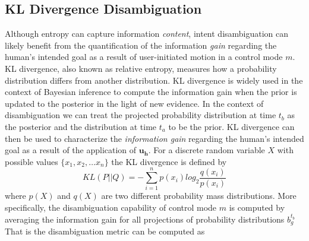 \documentclass[conference]{IEEEtran}
\begin{document}
\subsection{KL Divergence Disambiguation}\label{sssec:kl}
Although entropy can capture information \textit{content}, intent disambiguation can likely benefit from the quantification of the information \textit{gain} regarding the human's intended goal as a result of user-initiated motion in a control mode $m$. 
KL divergence, also known as relative entropy, measures how a probability distribution differs from another distribution. KL divergence is widely used in the context of Bayesian inference to compute the information gain when the prior is updated to the posterior in the light of new evidence. In the context of disambiguation we can treat the projected probability distribution at time $t_b$ as the posterior and the distribution at time $t_a$ to be the prior. KL divergence can then be used to characterize the \textit{information gain} regarding the human's intended goal as a result of the application of $\boldsymbol{u_h}$.
For a discrete random variable $X$ with possible values $\{x_1, x_2,\dots x_n\}$ the KL divergence is defined by
\begin{equation*}
KL(P||Q) = -\sum_{i=1}^{n}p(x_i)log_2\frac{q(x_i)}{p(x_i)}
\end{equation*}
where $p(X)$ and $q(X)$ are two different probability mass distributions. 
 More specifically, the disambiguation capability of control mode $m$ is computed by averaging the information gain for all projections of probability distributions $b_g^{t_b}$ That is the disambiguation metric can be computed as 
 
\end{document}
